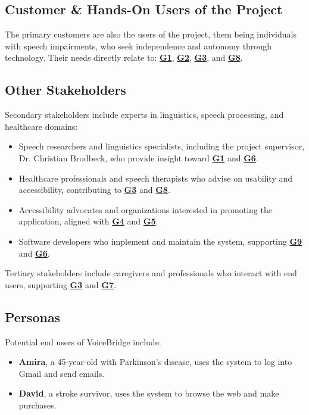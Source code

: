 \documentclass[12pt]{article}
\begin{document}
\subsection{Customer \& Hands-On Users of the Project}

The primary customers are also the users of the project, them being individuals with speech impairments, who seek independence and autonomy through technology. Their needs directly relate to: \textbf{\hyperref[tab:project-goals]{G1}}, \textbf{\hyperref[tab:project-goals]{G2}}, \textbf{\hyperref[tab:project-goals]{G3}}, and \textbf{\hyperref[tab:project-goals]{G8}}.

\subsection{Other Stakeholders}
Secondary stakeholders include experts in linguistics, speech processing, and healthcare domains:
\begin{itemize}
    \item Speech researchers and linguistics specialists, including the project supervisor, Dr. Christian Brodbeck, who provide insight toward \textbf{\hyperref[tab:project-goals]{G1}} and \textbf{\hyperref[tab:project-goals]{G6}}.
    \item Healthcare professionals and speech therapists who advise on usability and accessibility, contributing to \textbf{\hyperref[tab:project-goals]{G3}} and \textbf{\hyperref[tab:project-goals]{G8}}.
    \item Accessibility advocates and organizations interested in promoting the application, aligned with \textbf{\hyperref[tab:project-goals]{G4}} and \textbf{\hyperref[tab:project-goals]{G5}}.
    \item Software developers who implement and maintain the system, supporting \textbf{\hyperref[tab:project-goals]{G9}} and \textbf{\hyperref[tab:project-goals]{G6}}.
\end{itemize}

Tertiary stakeholders include caregivers and professionals who interact with end users, supporting \textbf{\hyperref[tab:project-goals]{G3}} and \textbf{\hyperref[tab:project-goals]{G7}}.

\subsection{Personas}

Potential end users of VoiceBridge include:
\begin{itemize}
    \item \textbf{Amira}, a 45-year-old with Parkinson’s disease, uses the system to log into Gmail and send emails.
    \item \textbf{David}, a stroke survivor, uses the system to browse the web and make purchases.
\end{itemize}
\end{document}
